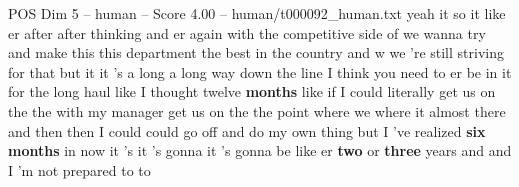 \begin{textsample}{POS Dim 5 – human – Score 4.00 – human/t000092\_human.txt}  \label{ex:f5_pos_019}
yeah it so it like er after after thinking and er again with the competitive side of we wanna try and make this this department the best in the country and w we 're still striving for that but it it 's a long a long way down the line I think you need to er be in it for the long haul like I thought twelve \textbf{months} like if I could literally get us on the the with my manager get us on the the point where we where it almost there and then then I could could go off and do my own thing but I 've realized \textbf{six} \textbf{months} in now it 's it 's gonna it 's gonna be like er \textbf{two} or \textbf{three} years and and I 'm not prepared to to

\end{textsample}
